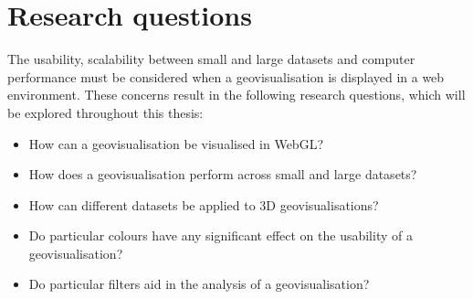 \section{Research questions} {
\label{sec:research_questions}


	The usability, scalability between small and large datasets and computer performance must be considered when a geovisualisation is displayed in a web environment. These concerns result in the following research questions, which will be explored throughout this thesis:

	\begin{itemize}
		\item How can a geovisualisation be visualised in WebGL?
		\item How does a geovisualisation perform across small and large datasets?
		\item How can different datasets be applied to 3D geovisualisations?
		\item Do particular colours have any significant effect on the usability of a geovisualisation?
		\item Do particular filters aid in the analysis of a geovisualisation?
	\end{itemize}

}
